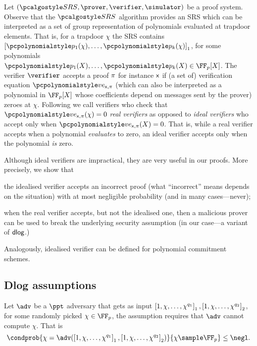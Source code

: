  Let
$(\SRScer, \prover, \verifier, \simulator)$ be a proof system.
Observe that the $\SRScer$ algorithm provides an SRS which can be interpreted as a set
of group representation of polynomials evaluated at trapdoor elements. That is, for a
trapdoor $\chi$ the SRS contains $\gone{\p{p_1}(\chi), \ldots, \p{p_k}(\chi)}$, for
some polynomials $\p{p_1}(X), \ldots, \p{p_k}(X) \in \FF_p[X]$. The verifier
$\verifier$ accepts a proof $\pi$ for instance $\mathsf{x}$ if (a set of) verification
equation $\vereq_{\inp, \zkproof}$ (which can also be interpreted as a polynomial in
$\FF_p[X]$ whose coefficients depend on messages sent by the prover) zeroes at
$\chi$. Following \cite{EPRINT:GabWilCio19} we call verifiers who check that
$\vereq_{\inp, \zkproof}(\chi) = 0$ \emph{real verifiers} as opposed to \emph{ideal
  verifiers} who accept only when $\vereq_{\inp, \zkproof}(X) = 0$. That is, while a
real verifier accepts when a polynomial \emph{evaluates} to zero, an ideal verifier
accepts only when the polynomial \emph{is} zero.

Although ideal verifiers are impractical, they are very useful in our
proofs. More precisely, we show that
\begin{compactenum}
\item the idealised verifier accepts an incorrect proof (what ``incorrect''
  means depends on the situation) with at most negligible probability (and in many
  cases---never);
\item when the real verifier accepts, but not the idealised one, then a malicious
  prover can be used to break the underlying security assumption (in our case---a
  variant of $\mathsf{dlog}$.)
\end{compactenum}

Analogously, idealised verifier can be defined for polynomial commitment schemes.

\subsection{Dlog assumptions}

\label{sec:dlog_assumptions}
\begin{definition}\label{def:dlog}
	Let $\adv$ be a $\ppt$ adversary that gets as input
  $\left[1, \chi, \ldots, \chi^{q_1}\right]_{1}, \left[1, \chi, \ldots, \chi^{q_2}\right]_{2}$, for
  some randomly picked $\chi \in \FF_p$, the assumption requires that $\adv$ cannot compute $\chi$. That is
	\[
		\condprob{\chi = \adv(\gone{1, \chi, \ldots, \chi^{q_1}}, \gtwo{1, \chi,
        \ldots, \chi^{q_2} })}{\chi \sample \FF_p} \leq \negl.
	\]
\end{definition}

